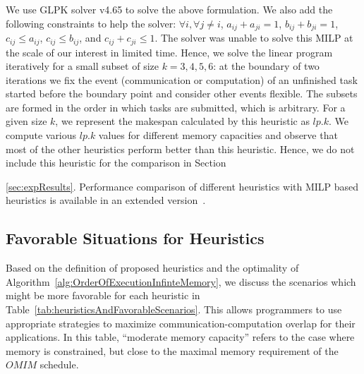 \documentclass[sigconf]{acmart}
\begin{document}
	We use GLPK solver v4.65 to solve the above formulation. We also add the following constraints to help the solver: $\forall i, \forall j\ne i$, $a_{ij} + a_{ji}=1$, $b_{ij} + b_{ji} = 1$, $c_{ij} \le a_{ij}$, $c_{ij} \le b_{ij}$, and  $c_{ij} + c_{ji} \le 1$. The solver was unable to  solve this MILP at the scale of our interest in limited time. Hence, we solve the linear program iteratively for a small subset of size $k=3, 4, 5, 6$: at the boundary of two iterations we fix the event (communication or computation) of an unfinished task started before the boundary point and consider other events flexible. The subsets are formed in the order in which tasks are submitted, which is arbitrary. For a given size $k$, we represent the makespan calculated by this heuristic as $lp.k$.
	We compute various $lp.k$ values for different memory capacities and observe that most of the other heuristics perform better than this heuristic. Hence, we do not include this heuristic for the comparison in Section~{\ref{sec:expResults}. Performance comparison of different heuristics with MILP based heuristics is available in an extended version~\cite{extendedVersion}.
		

		\subsection{Favorable Situations for Heuristics}

			Based on the definition of proposed heuristics and the optimality of Algorithm~\ref{alg:OrderOfExecutionInfinteMemory}, we discuss the scenarios which might be more favorable for each heuristic in Table~\ref{tab:heuristicsAndFavorableScenarios}. This allows programmers to use appropriate strategies to maximize communication-computation overlap for their applications. In this table, ``moderate memory capacity'' refers to the case where memory is constrained, but close to the maximal memory requirement of the $OMIM$ schedule.
			
}
\end{document}
